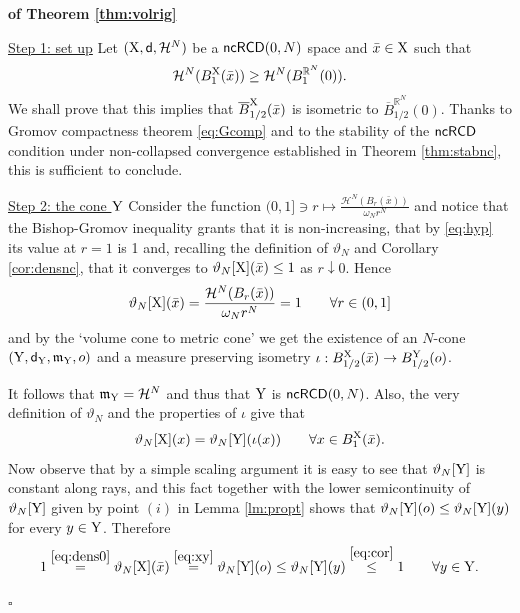 \documentclass[reqno,11pt]{article}
\numberwithin{equation}{section}
\newcommand{\R}{\mathbb{R}}
\newcommand{\mm}{{\mbox{\boldmath$m$}}}
\newcommand{\sfd}{{\sf d}}
\renewcommand{\mm}{\mathfrak m}                                %
\newenvironment{proofb}{\removelastskip\par\medskip   %
\noindent{\em{\bf Proof}} \rm}{\penalty-20\null\hfill$\square$\par\medbreak}
\newcommand{\X}{{\rm X}}
\newcommand{\Y}{{\rm Y}}
\newcommand{\ncRCD}{{\sf ncRCD}}
\newcommand{\HH}{{\mathcal H}}
\begin{document}
\begin{proofb}{\bf of Theorem \ref{thm:volrig}}

\noindent\underline{Step 1: set up} Let  $(\X,\sfd,\HH^N)$ be a $\ncRCD(0,N)$ space and $\bar x\in\X$ such that
\begin{equation}
\label{eq:hyp}
\HH^N(B^\X_1(\bar x))\geq\HH^N(B_1^{\R^N}(0)).
\end{equation}
We shall prove that this implies that $\overline B_{1/2}^{\X}(\bar x)$ is isometric to $\overline B_{1/2}^{\R^N}(0)$. Thanks to Gromov compactness theorem \eqref{eq:Gcomp} and to the stability of the $\ncRCD$ condition under non-collapsed convergence established in Theorem \ref{thm:stabnc}, this is sufficient to conclude.

\noindent\underline{Step 2: the cone $\Y$} Consider the function $(0,1]\ni r\mapsto \frac{\HH^N(B_r(\bar x))}{\omega_N r^N}$ and notice that the Bishop-Gromov inequality grants that it is non-increasing, that by \eqref{eq:hyp} its value at $r=1$ is 1 and, recalling the definition of $\vartheta_N$ and Corollary \ref{cor:densnc}, that it converges to $\vartheta_N[\X](\bar x)\leq 1$ as $r\downarrow0$. Hence
\begin{equation}
\label{eq:dens0}
\vartheta_N[\X](\bar x)=\frac{\HH^N(B_r(\bar x))}{\omega_N r^N}=1\qquad\forall r\in(0,1]
\end{equation} 
and by the `volume cone to metric cone' \cite[Theorem 1.1]{DPG16} we get the existence of  an $N$-cone $(\Y,\sfd_\Y,\mm_\Y,o)$ and a measure preserving isometry $\iota:B^\X_{1/2}(\bar x)\to B^\Y_{1/2}(o)$.

It follows that $\mm_\Y=\HH^N$ and thus that $\Y$ is $\ncRCD(0,N)$. Also, the very definition of $\vartheta_N$ and the properties of $\iota$ give that \begin{equation}
\label{eq:xy}
\vartheta_N[\X](x)=\vartheta_N[\Y](\iota(x))\qquad\forall x\in B^\X_1(\bar x).
\end{equation} 
Now observe that by a simple scaling argument it is easy to see that $\vartheta_N[\Y]$ is constant along rays, and this fact together with the lower semicontinuity of $\vartheta_N[\Y]$ given by point $(i)$ in  Lemma \ref{lm:propt} shows that $\vartheta_N[\Y](o)\leq\vartheta_N[\Y](y)$ for every $y\in\Y$. Therefore
\begin{equation}
\label{eq:u1}
1\stackrel{\eqref{eq:dens0}}=\vartheta_N[\X](\bar x)\stackrel{\eqref{eq:xy}}=\vartheta_N[\Y](o)\leq\vartheta_N[\Y](y)\stackrel{\eqref{eq:cor}}\leq1\qquad\forall y\in\Y.
\end{equation}


\end{proofb}
\end{document}
